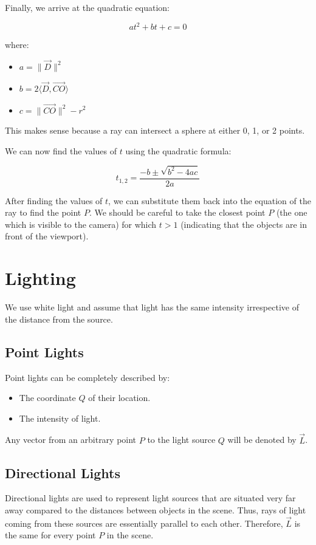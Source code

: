 \documentclass{article}
\begin{document}
Finally, we arrive at the quadratic equation:

$$at^2 + bt + c = 0$$

where:
\begin{itemize}
    \item $a = \| \vec{D} \|^2$
    \item $b = 2 \langle \vec{D}, \vec{CO} \rangle$
    \item $c = \| \vec{CO} \|^2 - r^2$
\end{itemize}

This makes sense because a ray can intersect a sphere at either 0, 1, or 2 points.

We can now find the values of $t$ using the quadratic formula:

$$t_{1,2} = \frac{-b \pm \sqrt{b^2 - 4ac}}{2a}$$

After finding the values of $t$, we can substitute them back into the equation of the ray to find the point $P$. We should be careful to take the closest point $P$ (the one which is visible to the camera) for which $t > 1$ (indicating that the objects are in front of the viewport).

\section{Lighting}

We use white light and assume that light has the same intensity irrespective of the distance from the source.

\subsection{Point Lights}

Point lights can be completely described by:
\begin{itemize}
    \item The coordinate $Q$ of their location.
    \item The intensity of light.
\end{itemize}

Any vector from an arbitrary point $P$ to the light source $Q$ will be denoted by $\vec{L}$.

\subsection{Directional Lights}

Directional lights are used to represent light sources that are situated very far away compared to the distances between objects in the scene. Thus, rays of light coming from these sources are essentially parallel to each other. Therefore, $\vec{L}$ is the same for every point $P$ in the scene.
\end{document}
